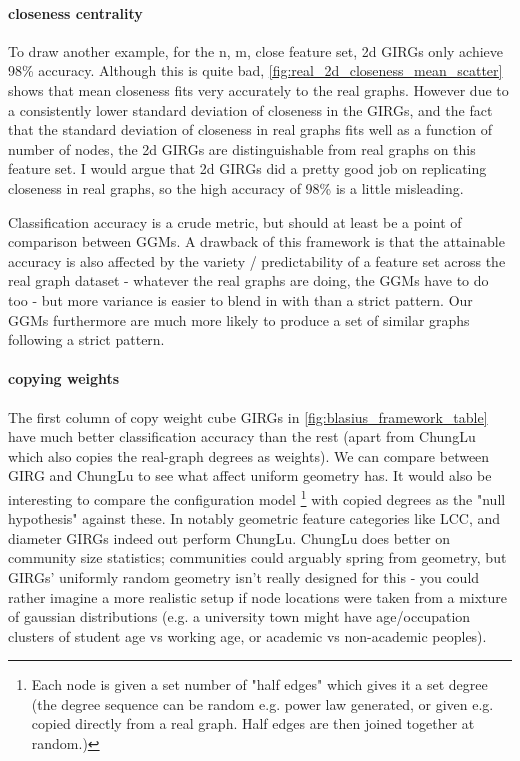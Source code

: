 \paragraph{closeness centrality}
To draw another example, for the n, m, close feature set, 2d GIRGs only achieve 98\% accuracy. Although this is quite bad, \cref{fig:real_2d_closeness_mean_scatter} shows that mean closeness fits very accurately to the real graphs. However due to a consistently lower standard deviation of closeness in the GIRGs, and the fact that the standard deviation of closeness in real graphs fits well as a function of number of nodes, the 2d GIRGs are distinguishable from real graphs on this feature set. I would argue that 2d GIRGs did a pretty good job on replicating closeness in real graphs, so the high accuracy of 98\% is a little misleading.

Classification accuracy is a crude metric, but should at least be a point of comparison between GGMs. 
A drawback of this framework is that the attainable accuracy is also affected by the variety / predictability of a feature set across the real graph dataset - whatever the real graphs are doing, the GGMs have to do too - but more variance is easier to blend in with than a strict pattern. Our GGMs furthermore are much more likely to produce a set of similar graphs following a strict pattern.

\paragraph{copying weights}
The first column of copy weight cube GIRGs in \cref{fig:blasius_framework_table} have much better classification accuracy than the rest (apart from ChungLu which also copies the real-graph degrees as weights). We can compare between GIRG and ChungLu to see what affect uniform geometry has. It would also be interesting to compare the configuration model \footnote{Each node is given a set number of "half edges" which gives it a set degree (the degree sequence can be random e.g. power law generated, or given e.g. copied directly from a real graph. Half edges are then joined together at random.)} with copied degrees as the "null hypothesis" against these. In notably geometric feature categories like LCC, and diameter GIRGs indeed out perform ChungLu. ChungLu does better on community size statistics; communities could arguably spring from geometry, but GIRGs' uniformly random geometry isn't really designed for this - you could rather imagine a more realistic setup if node locations were taken from a mixture of gaussian distributions (e.g. a university town might have age/occupation clusters of student age vs working age, or academic vs non-academic peoples).






